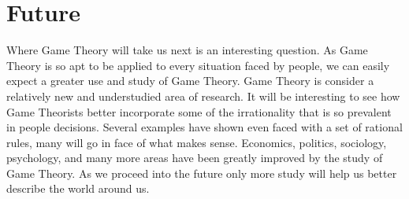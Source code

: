 \documentclass[12pt]{article}
\begin{document}
 	\section{Future}
	Where Game Theory will take us next is an interesting question. As Game Theory is so apt to be applied to every situation faced by people, we can easily expect a greater use and study of Game Theory. Game Theory is consider a relatively new and understudied area of research. It will be interesting to see how Game Theorists better incorporate some of the irrationality that is so prevalent in people decisions. Several examples have shown even faced with a set of rational rules, many will go in face of what makes sense. Economics, politics, sociology, psychology, and many more areas have been greatly improved by the study of Game Theory. As we proceed into the future only more study will help us better describe the world around us.
\end{document}
